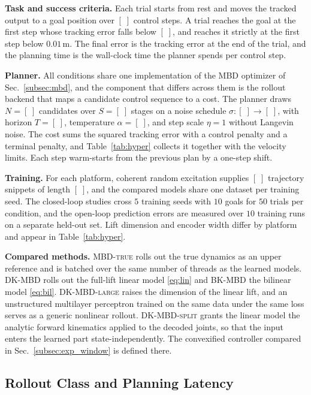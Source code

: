 \documentclass[letterpaper,10pt,conference]{ieeeconf}
\newcommand{\mbdtrue}{\textsc{MBD-true}}
\newcommand{\dkmbd}{\textsc{DK-MBD}}
\newcommand{\dksplit}{\textsc{DK-MBD-split}}
\newcommand{\bkmbd}{\textsc{BK-MBD}}
\begin{document}
\textbf{Task and success criteria.}
Each trial starts from rest and moves the tracked output to a goal position over $[\;]$ control steps.
A trial reaches the goal at the first step whose tracking error falls below $[\;]$, and reaches it strictly at the first step below $0.01$\,m.
The final error is the tracking error at the end of the trial, and the planning time is the wall-clock time the planner spends per control step.

\textbf{Planner.}
All conditions share one implementation of the MBD optimizer of Sec.~\ref{subsec:mbd}, and the component that differs across them is the rollout backend that maps a candidate control sequence to a cost.
The planner draws $N = [\;]$ candidates over $S = [\;]$ stages on a noise schedule $\sigma\!: [\;] \to [\;]$, with horizon $T = [\;]$, temperature $\alpha = [\;]$, and step scale $\eta = 1$ without Langevin noise.
The cost sums the squared tracking error with a control penalty and a terminal penalty, and Table~\ref{tab:hyper} collects it together with the velocity limits.
Each step warm-starts from the previous plan by a one-step shift.

\textbf{Training.}
For each platform, coherent random excitation supplies $[\;]$ trajectory snippets of length $[\;]$, and the compared models share one dataset per training seed.
The closed-loop studies cross $5$ training seeds with $10$ goals for $50$ trials per condition, and the open-loop prediction errors are measured over $10$ training runs on a separate held-out set.
Lift dimension and encoder width differ by platform and appear in Table~\ref{tab:hyper}.

\textbf{Compared methods.}
\mbdtrue{} rolls out the true dynamics as an upper reference and is batched over the same number of threads as the learned models.
\dkmbd{} rolls out the full-lift linear model \eqref{eq:lin} and \bkmbd{} the bilinear model \eqref{eq:bil}.
\textsc{DK-MBD-large} raises the dimension of the linear lift, and an unstructured multilayer perceptron trained on the same data under the same loss serves as a generic nonlinear rollout.
\dksplit{} grants the linear model the analytic forward kinematics applied to the decoded joints, so that the input enters the learned part state-independently.
The convexified controller compared in Sec.~\ref{subsec:exp_window} is defined there.
\subsection{Rollout Class and Planning Latency}\label{subsec:exp_franka}
\end{document}
